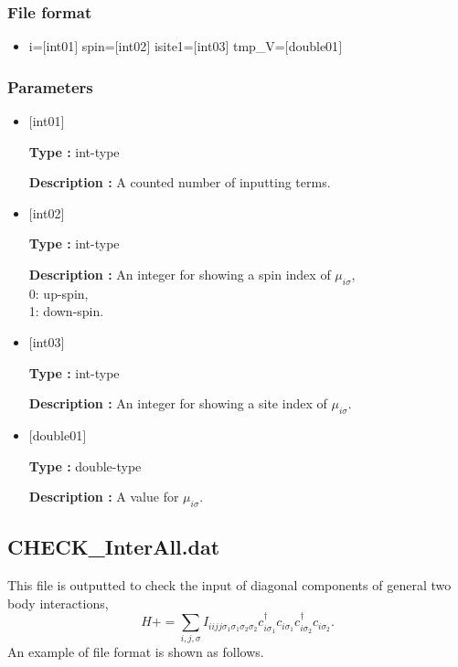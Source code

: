 \subsubsection{File format}
 \begin{itemize}
   \item  i=$[$int01$]$ spin=$[$int02$]$ isite1=$[$int03$]$ tmp\_V=$[$double01$]$ 
 \end{itemize}
  
\subsubsection{Parameters}
 \begin{itemize}

   \item  $[$int01$]$ 
   
    {\bf Type :} int-type

   {\bf Description :} A counted number of inputting terms.
   
   \item  $[$int02$]$ 
   
    {\bf Type :} int-type

   {\bf Description :}  An integer for showing a spin index of $\mu_{i\sigma}$,\\
0: up-spin,\\
1: down-spin.
   
   \item  $[$int03$]$ 
   
    {\bf Type :} int-type

    {\bf Description :}  An integer for showing a site index of $\mu_{i\sigma}$.
 
   \item  $[$double01$]$ 
   
    {\bf Type :} double-type

   {\bf Description :} A value for $\mu_{i\sigma}$.
     
\end{itemize}

\subsection{CHECK\_InterAll.dat}
This file is outputted to check the input of diagonal components of general two body interactions,
\begin{equation}
H+=\sum_{i,j, \sigma} I_{iijj\sigma_1\sigma_1\sigma_2\sigma_2} c_{i\sigma_1}^{\dagger}c_{i\sigma_1}c_{i\sigma_2}^{\dagger}c_{i\sigma_2}.
\end{equation}
An example of file format is shown as follows.

